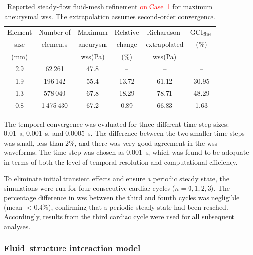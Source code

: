 \documentclass[12pt,a4paper]{article}
\newcommand{\cfdrevision}[1]{\textcolor{red}{#1}}
\newcommand{\WSS}{\ac{wss}\xspace}
\theoremstyle{definition}
\numberwithin{equation}{section}
\begin{document}
\begin{table}[ht!]
\centering
\setlength{\tabcolsep}{3.5pt}
\caption{Reported steady-flow fluid-mesh refinement \cfdrevision{on Case~1} for maximum aneurysmal \WSS. The extrapolation assumes second-order convergence.}
\label{tab:mesh_study}
\setlength{\tabcolsep}{7pt}
\begin{tabular}{cccccc}
\toprule
Element & Number of & Maximum & Relative & Richardson- & GCI$_{\rm fine}$ \\
size & elements & aneurysm & change & extrapolated & (\%) \\
(mm) & & \WSS (Pa) & (\%) & \WSS (Pa) & \\
\midrule
2.9 & 62\,261    & 47.8 & --    & --    & -- \\
1.9 & 196\,142   & 55.4 & 13.72 & 61.12 & 30.95 \\
1.3 & 578\,040   & 67.8 & 18.29 & 78.71 & 48.29 \\
0.8 & 1\,475\,430 & 67.2 & 0.89  & 66.83 & 1.63 \\
\bottomrule
\end{tabular}
\end{table}


The temporal convergence was evaluated for three different time step sizes: 0.01~s, 0.001~s, and 0.0005~s. The difference between the two smaller time steps was small, less than 2\%, and there was very good agreement in the \WSS waveforms. The time step was chosen as 0.001~s, which was found to be adequate in terms of both the level of temporal resolution and computational efficiency.

To eliminate initial transient effects and ensure a periodic steady state, the simulations were run for four consecutive cardiac cycles (\(n = 0,1,2,3\)). The percentage difference in \WSS between the third and fourth cycles was negligible (mean \(< 0.4\%\)), confirming that a periodic steady state had been reached. Accordingly, results from the third cardiac cycle were used for all subsequent analyses.



\subsubsection{Fluid--structure interaction model}
\end{document}
